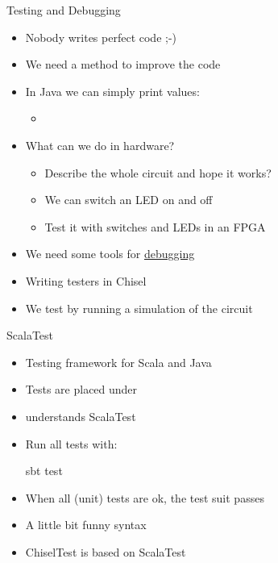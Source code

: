 \begin{frame}[fragile]{Testing and Debugging}
\begin{itemize}
\item Nobody writes perfect code ;-)
\item We need a method to improve the code
\item In Java we can simply print values:
\begin{itemize}
\item {}
\end{itemize}
\item What can we do in hardware?
\begin{itemize}
\item Describe the whole circuit and hope it works?
\item We can switch an LED on and off
\item Test it with switches and LEDs in an FPGA
\end{itemize}
\item We need some tools for \href{https://en.wikipedia.org/wiki/Debugging#/media/File:H96566k.jpg}{debugging}
\item Writing testers in Chisel
\item We test by running a simulation of the circuit
\end{itemize}
\end{frame}

\begin{frame}[fragile]{ScalaTest}
\begin{itemize}
\item Testing framework for Scala and Java
\item Tests are placed under 
\item {} understands ScalaTest
\item Run all tests with:
\begin{chisel}
sbt test
\end{chisel}
\item When all (unit) tests are ok, the test suit passes
\item A little bit funny syntax
\item ChiselTest is based on ScalaTest
\end{itemize}
\end{frame}

